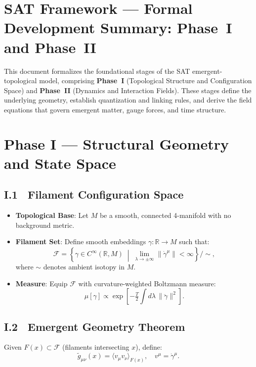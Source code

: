 
\section{SAT Framework — Formal Development Summary: Phase~I and Phase~II}

This document formalizes the foundational stages of the SAT emergent-topological model, comprising \textbf{Phase~I} (Topological Structure and Configuration Space) and \textbf{Phase~II} (Dynamics and Interaction Fields). These stages define the underlying geometry, establish quantization and linking rules, and derive the field equations that govern emergent matter, gauge forces, and time structure.

\tableofcontents

\section{Phase I — Structural Geometry and State Space}

\subsection{I.1~ Filament Configuration Space}

\begin{itemize}
  \item \textbf{Topological Base}: Let $M$ be a smooth, connected 4-manifold with no background metric.
  \item \textbf{Filament Set}: Define smooth embeddings $\gamma: \mathbb{R} \rightarrow M$ such that:
  \[
      \mathcal F = \left\{ \gamma \in C^\infty(\mathbb R, M) \;\middle|\; \lim_{\lambda\to\pm\infty} \|\dot{\gamma}^\mu\| < \infty \right\} \Big/ \sim,
  \]
  where $\sim$ denotes ambient isotopy in $M$.
  \item \textbf{Measure}: Equip $\mathcal{F}$ with curvature-weighted Boltzmann measure:
  \[
  \mu[\gamma] \propto \exp\left[-\tfrac{T}{2} \int d\lambda\, \|\ddot\gamma\|^2\right].
  \]
\end{itemize}

\subsection{I.2~ Emergent Geometry Theorem}

Given $F(x)\subset\mathcal F$ (filaments intersecting $x$), define:
\[
  \tilde g_{\mu\nu}(x) = \langle v_\mu v_\nu \rangle_{F(x)},\quad v^\mu = \dot\gamma^\mu.
\]

